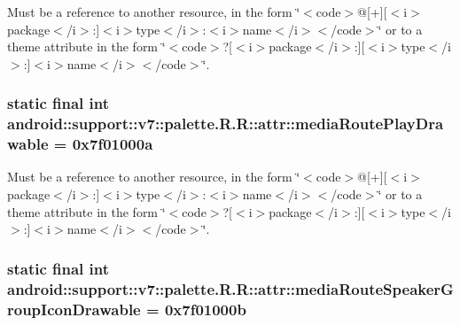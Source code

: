 Must be a reference to another resource, in the form \char`\"{}$<$code$>$@\mbox{[}+\mbox{]}\mbox{[}$<$i$>$package$<$/i$>$:\mbox{]}$<$i$>$type$<$/i$>$:$<$i$>$name$<$/i$>$$<$/code$>$\char`\"{} or to a theme attribute in the form \char`\"{}$<$code$>$?\mbox{[}$<$i$>$package$<$/i$>$:\mbox{]}\mbox{[}$<$i$>$type$<$/i$>$:\mbox{]}$<$i$>$name$<$/i$>$$<$/code$>$\char`\"{}. \hypertarget{classandroid_1_1support_1_1v7_1_1palette_1_1_r_1_1attr_361324bfaa709d146c4ccf9e143f46e4}{
\subsubsection[{mediaRoutePlayDrawable}]{\setlength{\rightskip}{0pt plus 5cm}static final int android::support::v7::palette.R.R::attr::mediaRoutePlayDrawable = 0x7f01000a}}
\label{classandroid_1_1support_1_1v7_1_1palette_1_1_r_1_1attr_361324bfaa709d146c4ccf9e143f46e4}


Must be a reference to another resource, in the form \char`\"{}$<$code$>$@\mbox{[}+\mbox{]}\mbox{[}$<$i$>$package$<$/i$>$:\mbox{]}$<$i$>$type$<$/i$>$:$<$i$>$name$<$/i$>$$<$/code$>$\char`\"{} or to a theme attribute in the form \char`\"{}$<$code$>$?\mbox{[}$<$i$>$package$<$/i$>$:\mbox{]}\mbox{[}$<$i$>$type$<$/i$>$:\mbox{]}$<$i$>$name$<$/i$>$$<$/code$>$\char`\"{}. \hypertarget{classandroid_1_1support_1_1v7_1_1palette_1_1_r_1_1attr_e9a40149cba6e973ec1ededecf1a29af}{
\subsubsection[{mediaRouteSpeakerGroupIconDrawable}]{\setlength{\rightskip}{0pt plus 5cm}static final int android::support::v7::palette.R.R::attr::mediaRouteSpeakerGroupIconDrawable = 0x7f01000b}}
\label{classandroid_1_1support_1_1v7_1_1palette_1_1_r_1_1attr_e9a40149cba6e973ec1ededecf1a29af}


